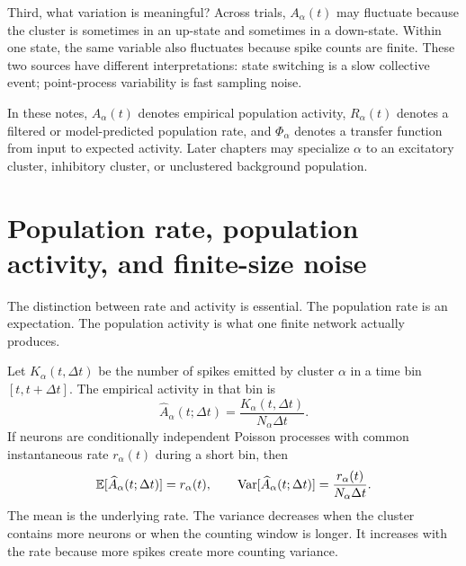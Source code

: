 Third, what variation is meaningful? Across trials, $A_\alpha(t)$ may fluctuate because the cluster is sometimes in an up-state and sometimes in a down-state. Within one state, the same variable also fluctuates because spike counts are finite. These two sources have different interpretations: state switching is a slow collective event; point-process variability is fast sampling noise.

\begin{aside}
In these notes, $A_\alpha(t)$ denotes empirical population activity, $R_\alpha(t)$ denotes a filtered or model-predicted population rate, and $\Phi_\alpha$ denotes a transfer function from input to expected activity. Later chapters may specialize $\alpha$ to an excitatory cluster, inhibitory cluster, or unclustered background population.
\end{aside}

\section{Population rate, population activity, and finite-size noise}
\label{sec:population-rate-activity-finite-size-noise}

The distinction between rate and activity is essential. The population rate is an expectation. The population activity is what one finite network actually produces.

Let $K_\alpha(t,\Delta t)$ be the number of spikes emitted by cluster $\alpha$ in a time bin $[t,t+\Delta t]$. The empirical activity in that bin is
%
\begin{equation}
  \widehat A_\alpha(t;\Delta t)
  =
  \frac{K_\alpha(t,\Delta t)}{N_\alpha \Delta t}.
  \label{eq:binned-population-activity}
\end{equation}
%
If neurons are conditionally independent Poisson processes with common instantaneous rate $r_\alpha(t)$ during a short bin, then
%
\begin{equation}
  \mathbb{E}[\widehat A_\alpha(t;\Delta t)]
  =
  r_\alpha(t),
  \qquad
  \operatorname{Var}[\widehat A_\alpha(t;\Delta t)]
  =
  \frac{r_\alpha(t)}{N_\alpha \Delta t}.
  \label{eq:finite-size-activity-variance}
\end{equation}
%
The mean is the underlying rate. The variance decreases when the cluster contains more neurons or when the counting window is longer. It increases with the rate because more spikes create more counting variance.

